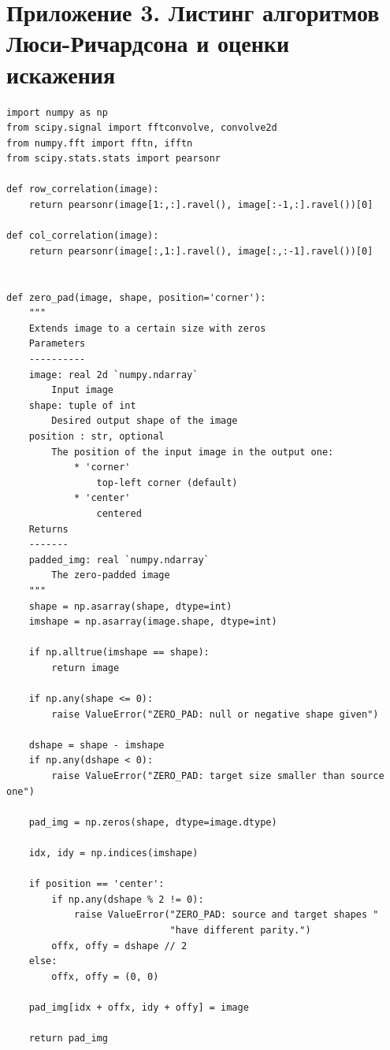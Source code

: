 \chapter*{Приложение 3. Листинг алгоритмов Люси-Ричардсона и оценки искажения}
\begin{verbatim}
import numpy as np
from scipy.signal import fftconvolve, convolve2d
from numpy.fft import fftn, ifftn
from scipy.stats.stats import pearsonr

def row_correlation(image):
    return pearsonr(image[1:,:].ravel(), image[:-1,:].ravel())[0]
    
def col_correlation(image):
    return pearsonr(image[:,1:].ravel(), image[:,:-1].ravel())[0]


def zero_pad(image, shape, position='corner'):
    """
    Extends image to a certain size with zeros
    Parameters
    ----------
    image: real 2d `numpy.ndarray`
        Input image
    shape: tuple of int
        Desired output shape of the image
    position : str, optional
        The position of the input image in the output one:
            * 'corner'
                top-left corner (default)
            * 'center'
                centered
    Returns
    -------
    padded_img: real `numpy.ndarray`
        The zero-padded image
    """
    shape = np.asarray(shape, dtype=int)
    imshape = np.asarray(image.shape, dtype=int)

    if np.alltrue(imshape == shape):
        return image

    if np.any(shape <= 0):
        raise ValueError("ZERO_PAD: null or negative shape given")

    dshape = shape - imshape
    if np.any(dshape < 0):
        raise ValueError("ZERO_PAD: target size smaller than source one")

    pad_img = np.zeros(shape, dtype=image.dtype)

    idx, idy = np.indices(imshape)

    if position == 'center':
        if np.any(dshape % 2 != 0):
            raise ValueError("ZERO_PAD: source and target shapes "
                             "have different parity.")
        offx, offy = dshape // 2
    else:
        offx, offy = (0, 0)

    pad_img[idx + offx, idy + offy] = image

    return pad_img


\end{verbatim}
